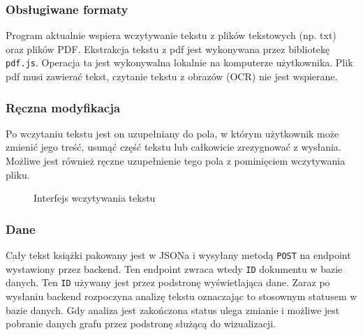 \documentclass[12pt,a4paper]{article} %
\begin{document}
        \subsubsection{Obsługiwane formaty}
            Program aktualnie wspiera wczytywanie tekstu z plików tekstowych (np. txt) oraz plików PDF. Ekstrakcja tekstu z pdf jest wykonywana przez bibliotekę \texttt{pdf.js}. Operacja ta jest wykonywalna lokalnie na komputerze użytkownika. Plik pdf musi zawierać tekst, czytanie tekstu z obrazów (OCR) nie jest wspierane.
        
        \subsubsection{Ręczna modyfikacja}
            Po wczytaniu tekstu jest on uzupełniany do pola, w którym użytkownik może zmienić jego treść, usunąć część tekstu lub całkowicie zrezygnować z wysłania. Możliwe jest również ręczne uzupełnienie tego pola z pominięciem wczytywania pliku.
            
            \begin{figure}[h!]
                \centering
                \caption{Interfejs wczytywania tekstu}
            \end{figure}
            
        \subsubsection{Dane}
            Cały tekst książki pakowany jest w JSONa i wysyłany metodą \texttt{POST} na endpoint wystawiony przez backend. Ten endpoint zwraca wtedy \texttt{ID} dokumentu w bazie danych. Ten \texttt{ID} używany jest przez podstronę wyświetlająca dane. Zaraz po wysłaniu backend rozpoczyna analizę tekstu oznaczając to stosownym statusem w bazie danych. Gdy analiza jest zakończona status ulega zmianie i możliwe jest pobranie danych grafu przez podstronę służącą do wizualizacji.
            
\end{document}
